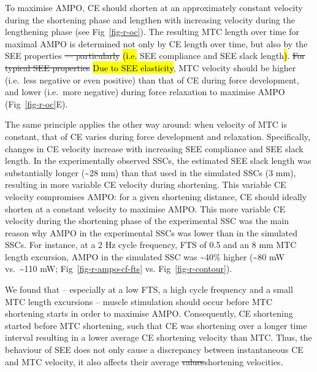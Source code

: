 \documentclass[
  10pt,
  letterpaper,
]{article}
\begin{document}
To maximise AMPO, CE should shorten at an approximately constant
velocity during the shortening phase and lengthen with increasing
velocity during the lengthening phase (see Fig~\ref{fig-r-oc}). The
resulting MTC length over time for maximal AMPO is determined not only
by CE length over time, but also by the SEE properties \st{---
particularly} \hl{(i.e.} SEE compliance and SEE slack length\hl{)}.
\st{For typical SEE properties} \hl{Due to SEE elasticity}, MTC velocity
should be higher (i.e.~less negative or even positive) than that of CE
during force development, and lower (i.e.~more negative) during force
relaxation to maximise AMPO (Fig~\ref{fig-r-oc}E).

The same principle applies the other way around: when velocity of MTC is
constant, that of CE varies during force development and relaxation.
Specifically, changes in CE velocity increase with increasing SEE
compliance and SEE slack length. In the experimentally observed SSCs,
the estimated SEE slack length was substantially longer
(\textasciitilde28 mm) than that used in the simulated SSCs (3 mm),
resulting in more variable CE velocity during shortening. This variable
CE velocity compromises AMPO: for a given shortening distance, CE should
ideally shorten at a constant velocity to maximise AMPO. This more
variable CE velocity during the shortening phase of the experimental SSC
was the main reason why AMPO in the experimental SSCs was lower than in
the simulated SSCs. For instance, at a 2 Hz cycle frequency, FTS of 0.5
and an 8 mm MTC length excursion, AMPO in the simulated SSC was
\textasciitilde40\% higher (\textasciitilde80 mW vs.~\textasciitilde110
mW; Fig~\ref{fig-r-ampo-cf-fts} vs. Fig~\ref{fig-r-contour}).

We found that -- especially at a low FTS, a high cycle frequency and a
small MTC length excursions -- muscle stimulation should occur before
MTC shortening starts in order to maximise AMPO. Consequently, CE
shortening started before MTC shortening, such that CE was shortening
over a longer time interval resulting in a lower average CE shortening
velocity than MTC. Thus, the behaviour of SEE does not only cause a
discrepancy between instantaneous CE and MTC velocity, it also affects
their average \st{values}shortening velocities.
\end{document}
